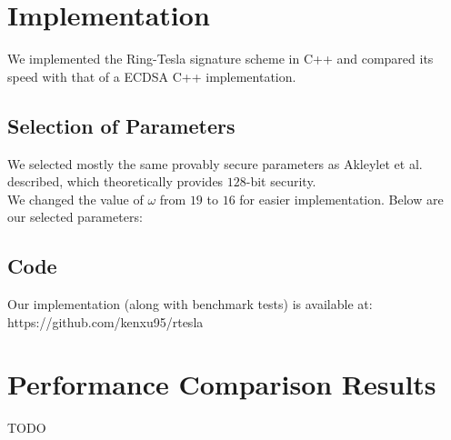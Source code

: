 \documentclass[letterpaper,twocolumn,10pt]{article}
\begin{document}
\section{Implementation}
We implemented the Ring-Tesla signature scheme in C++ and compared its speed with that of a ECDSA C++ implementation.

\subsection{Selection of Parameters}
We selected mostly the same provably secure parameters as Akleylet et al. \cite{rTesla} described, which theoretically provides $128$-bit security. \\
We changed the value of $\omega$ from $19$ to $16$ for easier implementation. Below are our selected parameters:\\


\subsection{Code}
Our implementation (along with benchmark tests) is available at: \\
https://github.com/kenxu95/rtesla\\


\section{Performance Comparison Results}
TODO


{\footnotesize 
}


\end{document}
